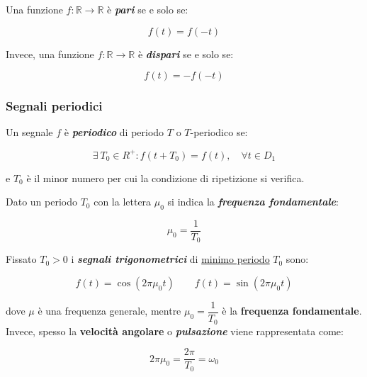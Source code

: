\documentclass[a4paper]{article}
\begin{document}
	Una funzione $f:\mathbb{R}\rightarrow\mathbb{R}$ è \textbf{\emph{pari}} se e solo se:
	
	\begin{equation*}
		f(t) = f(-t)
	\end{equation*}

	\noindent
	Invece, una funzione $f:\mathbb{R}\rightarrow\mathbb{R}$ è \textbf{\emph{dispari}} se e solo se:
	
	\begin{equation*}
		f(t) = -f(-t)
	\end{equation*}

	\newpage
	
	\subsubsection{Segnali periodici}
	
	Un segnale $f$ è \textbf{\emph{periodico}} di periodo $T$ o $T$-periodico se:
	
	\begin{equation*}
		\exists\:T_0 \in R^+ : f \left(t + T_0\right) = f(t), \hspace{1em} \forall t \in D_1
	\end{equation*}

	\noindent
	e $T_0$ è il minor numero per cui la condizione di ripetizione si verifica.
	
	Dato un periodo $T_0$ con la lettera $\mu_0$ si indica la \textbf{\emph{frequenza fondamentale}}:
	
	\begin{equation*}
		\mu_0 = \dfrac{1}{T_0}
	\end{equation*}

	Fissato $T_0 > 0$ i \textbf{\emph{segnali trigonometrici}}  di \underline{minimo periodo} $T_0$ sono:
	
	\begin{equation*}
		f(t) = \cos{\left(2 \pi \mu_{0} t \right)} \hspace{2em} f(t) = \sin{\left(2 \pi \mu_0 t\right)}
	\end{equation*}

	\noindent
	dove $\mu$ è una frequenza generale, mentre $\mu_0 = \dfrac{1}{T_0}$ è la \textbf{frequenza fondamentale}. Invece, spesso la \textbf{velocità angolare} o \textbf{\emph{pulsazione}} viene rappresentata come:
	
	\begin{equation*}
		2 \pi \mu_0 = \dfrac{2\pi}{T_0} = \omega_0
	\end{equation*}
\end{document}
